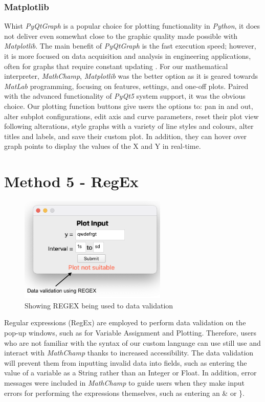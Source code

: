 \documentclass[a4paper, oneside, 11pt]{report}
\begin{document}
\newpage
\subsubsection{Matplotlib}
Whist \emph{PyQtGraph} is a popular choice for plotting functionality in \emph{Python}, it does not deliver even somewhat close to the graphic quality made possible with \emph{Matplotlib}. The main benefit of \emph{PyQtGraph} is the fast execution speed; however, it is more focused on data acquisition and analysis in engineering applications, often for graphs that require constant updating \cite{pyqtgraphdevs2022}. For our mathematical interpreter, \emph{MathChamp}, \emph{Matplotlib} was the better option as it is geared towards \emph{MatLab} programming, focusing on features, settings, and one-off plots. Paired with the advanced functionality of \emph{PyQt5} system support, it was the obvious choice. Our plotting function buttons give users the options to: pan in and out, alter subplot configurations, edit axis and curve parameters, reset their plot view following alterations, style graphs with a variety of line styles and colours, alter titles and labels, and save their custom plot. In addition, they can hover over graph points to display the values of the X and Y in real-time.


\section{Method 5 - RegEx}

\begin{figure}[H]
    \centering
    \includegraphics[width=7cm]{regex.png}
    \caption{Showing REGEX being used to data validation}
    \label{fig:regex_validation}
\end{figure}

Regular expressions (RegEx) are employed to perform data validation on the pop-up windows, such as for Variable Assignment and Plotting. Therefore, users who are not familiar with the syntax of our custom language can use still use and interact with \emph{MathChamp} thanks to increased accessibility. The data validation will prevent them from inputting invalid data into fields, such as entering the value of a variable as a String rather than an Integer or Float. In addition, error messages were included in \emph{MathChamp} to guide users when they make input errors for performing the expressions themselves, such as entering an \& or \}.
\end{document}
